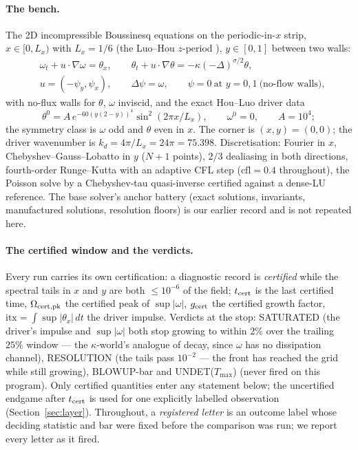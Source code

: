 \documentclass[11pt,a4paper]{article}
\newcommand{\abs}[1]{\lvert #1 \rvert}
\newcommand{\kd}{k_d}
\newcommand{\Om}{\Omega_{\rm cert,pk}}
\newcommand{\tcert}{t_{\rm cert}}
\begin{document}
\paragraph{The bench.} The 2D incompressible Boussinesq equations on the periodic-in-$x$ strip, $x\in[0,L_x)$ with $L_x=1/6$ (the Luo--Hou $z$-period \cite{LH14}), $y\in[0,1]$ between two walls:
\begin{align*}
&\omega_t+u\cdot\nabla\omega=\theta_x,\qquad \theta_t+u\cdot\nabla\theta=-\kappa(-\Delta)^{\sigma/2}\theta,\\
&u=(-\psi_y,\psi_x),\qquad \Delta\psi=\omega,\qquad \psi=0\ \text{at }y=0,1\ \text{(no-flow walls)},
\end{align*}
with no-flux walls for $\theta$, $\omega$ inviscid, and the exact Hou--Luo driver data \cite{LH14}
\[
\theta^0=A\,e^{-60(y(2-y))^4}\sin^2(2\pi x/L_x),\qquad \omega^0=0,\qquad A=10^4;
\]
the symmetry class is $\omega$ odd and $\theta$ even in $x$. The corner is $(x,y)=(0,0)$; the driver wavenumber is $\kd=4\pi/L_x=24\pi=75.398$. Discretisation: Fourier in $x$, Chebyshev--Gauss--Lobatto in $y$ ($N+1$ points), $2/3$ dealiasing in both directions, fourth-order Runge--Kutta with an adaptive CFL step ($\mathrm{cfl}=0.4$ throughout), the Poisson solve by a Chebyshev-tau quasi-inverse certified against a dense-LU reference. The base solver's anchor battery (exact solutions, invariants, manufactured solutions, resolution floors) is our earlier record and is not repeated here.

\paragraph{The certified window and the verdicts.} Every run carries its own certification: a diagnostic record is \emph{certified} while the spectral tails in $x$ and $y$ are both $\le10^{-6}$ of the field; $\tcert$ is the last certified time, $\Om$ the certified peak of $\sup\abs\omega$, $g_{\rm cert}$ the certified growth factor, $\mathrm{itx}=\int\sup\abs{\theta_x}\,dt$ the driver impulse. Verdicts at the stop: SATURATED (the driver's impulse and $\sup\abs\omega$ both stop growing to within $2\%$ over the trailing $25\%$ window --- the $\kappa$-world's analogue of decay, since $\omega$ has no dissipation channel), RESOLUTION (the tails pass $10^{-2}$ --- the front has reached the grid while still growing), BLOWUP-bar and UNDET($T_{\max}$) (never fired on this program). Only certified quantities enter any statement below; the uncertified endgame after $\tcert$ is used for one explicitly labelled observation (Section~\ref{sec:layer}). Throughout, a \emph{registered letter} is an outcome label whose deciding statistic and bar were fixed before the comparison was run; we report every letter as it fired.
\end{document}
